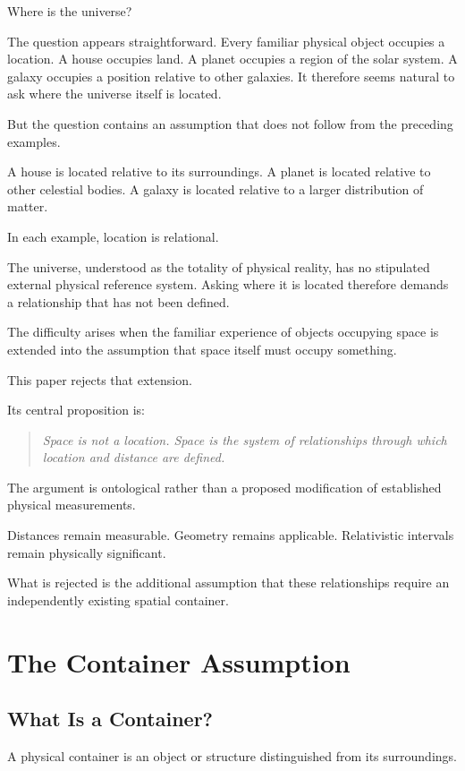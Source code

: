 \documentclass[12pt,onecolumn]{article}
\begin{document}
Where is the universe?

The question appears straightforward. Every familiar
physical object occupies a location. A house occupies
land. A planet occupies a region of the solar system.
A galaxy occupies a position relative to other
galaxies. It therefore seems natural to ask where
the universe itself is located.

But the question contains an assumption that does
not follow from the preceding examples.

A house is located relative to its surroundings.
A planet is located relative to other celestial
bodies. A galaxy is located relative to a larger
distribution of matter.

In each example, location is relational.

The universe, understood as the totality of physical
reality, has no stipulated external physical
reference system. Asking where it is located
therefore demands a relationship that has not
been defined.

The difficulty arises when the familiar experience
of objects occupying space is extended into the
assumption that space itself must occupy something.

This paper rejects that extension.

Its central proposition is:

\begin{quote}
\emph{Space is not a location. Space is the system
of relationships through which location and
distance are defined.}
\end{quote}

The argument is ontological rather than a proposed
modification of established physical measurements.

Distances remain measurable. Geometry remains
applicable. Relativistic intervals remain physically
significant.

What is rejected is the additional assumption that
these relationships require an independently existing
spatial container.

\section{The Container Assumption}

\subsection{What Is a Container?}

A physical container is an object or structure
distinguished from its surroundings.
\end{document}

